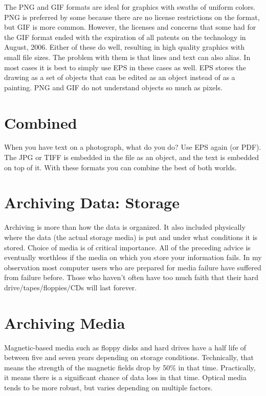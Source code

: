 \documentclass[a4paper]{article}
\begin{document}
The PNG and GIF formats are ideal for graphics with swaths of uniform
colors. PNG is preferred by some because there are no license
restrictions on the format, but GIF is more common. However, the
licenses and concerns that some had for the GIF format ended with the
expiration of all patents on the technology in August, 2006. Either of
these do well, resulting in high quality graphics with small file sizes.
The problem with them is that lines and text can also alias. In most
cases it is best to simply use EPS in these cases as well. EPS stores
the drawing as a set of objects that can be edited as an object instead
of as a painting. PNG and GIF do not understand objects so much as
pixels.


\section{Combined%
  \label{combined}%
}

When you have text on a photograph, what do you do? Use EPS again (or
PDF). The JPG or TIFF is embedded in the file as an object, and the text
is embedded on top of it. With these formats you can combine the best of
both worlds.


\section{Archiving Data: Storage%
  \label{archiving-data-storage}%
}

Archiving is more than how the data is organized. It also included
physically where the data (the actual storage media) is put and under
what conditions it is stored. Choice of media is of critical importance.
All of the preceding advice is eventually worthless if the media on
which you store your information fails. In my observation most computer
users who are prepared for media failure have suffered from failure
before. Those who haven't often have too much faith that their hard
drive/tapes/floppies/CDs will last forever.


\section{Archiving Media%
  \label{archiving-media}%
}

Magnetic-based media such as floppy disks and hard drives have a half
life of between five and seven years depending on storage conditions.
Technically, that means the strength of the magnetic fields drop by 50\%
in that time. Practically, it means there is a significant chance of
data loss in that time. Optical media tends to be more robust, but
varies depending on multiple factors.
\end{document}
